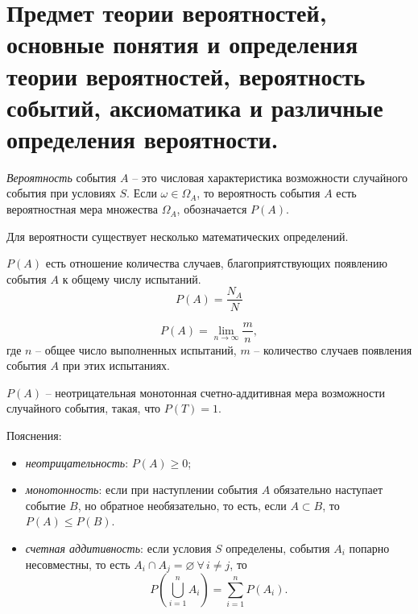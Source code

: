 \documentclass[polytech/stats/exam-2023/stats-exam-2023.tex]{subfiles}
\begin{document}
\section{Предмет теории вероятностей, основные понятия и определения теории вероятностей, вероятность событий, аксиоматика и различные определения вероятности.}
    \textit{Вероятность} события $A$ -- это числовая характеристика возможности случайного события при условиях $S$. Если $\omega \in \Omega_A$,
    то вероятность события $A$ есть вероятностная мера множества $\Omega_A$, обозначается $P(A)$.
    
    Для вероятности существует несколько математических определений.
    \begin{definition}
        $P(A)$ есть отношение количества случаев, благоприятствующих появлению события $A$ к общему числу испытаний.
        \begin{equation*}
            P(A) = \frac{N_A}{N}
        \end{equation*}
    \end{definition}
    \begin{definition}
        \begin{equation*}
            P(A) = \lim_{n \to \infty } \frac{m}{n},
        \end{equation*}
        где $n$ -- общее число выполненных испытаний, $m$ -- количество случаев появления события $A$ при этих испытаниях.
    \end{definition}
    \begin{definition}
        $P(A)$ -- неотрицательная монотонная счетно-аддитивная мера возможности случайного события, такая, что $P(T) = 1$.
        \vspace{0.5cm}
        
        Пояснения:
        \begin{itemize}
            \item \textit{неотрицательность}: $P(A) \geq 0$;
            \item \textit{монотонность}: если при наступлении события $A$ обязательно наступает событие $B$, но обратное
            необязательно, то есть, если $A \subset B$, то $P(A) \leq P(B)$.
            \item \textit{счетная аддитивность}: если условия $S$ определены, события $A_i$ попарно несовместны, то есть
            $A_i \cap A_j = \varnothing \ \forall \, i \neq j$, то
            \begin{equation*}
                P\left(\bigcup_{i=1}^n A_i\right) = \sum_{i=1}^n P\left(A_i\right).
            \end{equation*}
        \end{itemize}
    \end{definition}
    
\end{document}
